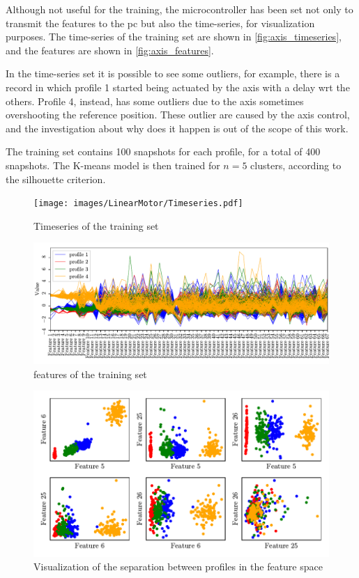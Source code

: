 Although not useful for the training, the microcontroller has been set not only to transmit the features to the \gls{pc} but also the time-series, for visualization purposes. The time-series of the training set are shown in \autoref{fig:axis_timeseries}, and the features are shown in \autoref{fig:axis_features}.

In the time-series set it is possible to see some outliers, for example, there is a record in which profile 1 started being actuated by the axis with a delay \gls{wrt} the others. Profile 4, instead, has some outliers due to the axis sometimes overshooting the reference position. These outlier are caused by the axis control, and the investigation about why does it happen is out of the scope of this work. 

The training set contains 100 snapshots for each profile, for a total of 400 snapshots. The K-means model is then trained for $n=5$ clusters, according to the silhouette criterion.

\begin{figure}
    \centering
    \texttt{[image: images/LinearMotor/Timeseries.pdf]}
    \caption{Timeseries of the training set}
    \label{fig:axis_timeseries}
\end{figure}


\begin{figure}
    \centering
    \includegraphics[width=\textwidth]{images/LinearMotor/Features.pdf}
    \caption{features of the training set}
    \label{fig:axis_features}
\end{figure}

\begin{figure}
    \centering
    \includegraphics{images/LinearMotor/Scatter.pdf}
    \caption{Visualization of the separation between profiles in the feature space}
    \label{fig:axis_training}
\end{figure}

